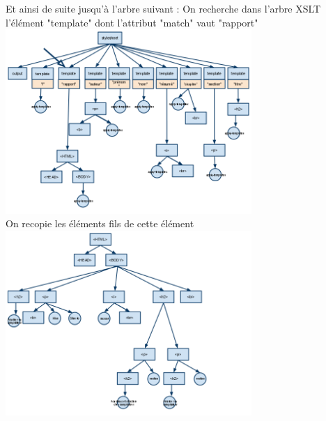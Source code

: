 \begin{center}
	        Et ainsi de suite jusqu'à l'arbre suivant : 
	        On recherche dans l'arbre XSLT l'élément "template" dont l'attribut "match" vaut "rapport"
	        \includegraphics[width=0.7\textwidth]{img/XSLTa.png}\\
	        
	        On recopie les éléments fils de cette élément
	        \includegraphics[width=0.7\textwidth]{img/ArbreHTML.png}
	    \end{center}
